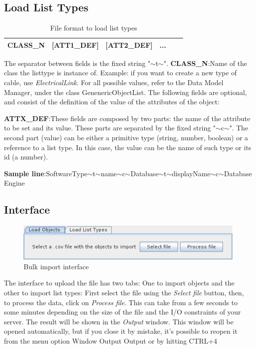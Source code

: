 \documentclass[a4paper]{article}
\begin{document}
			\subsection{Load List Types}\label{sec:bi_load_list_types}	
				\begin{table}[!h]
					\centering
					\begin{tabular}{|l|l|l|l|l|l|}
						\hline
						CLASS\_N& [ATT1\_DEF] & [ATT2\_DEF] & ...  \\ \hline
					\end{tabular}
					\caption{File format to load list types}
					\label{tab:file_format_list_types}
				\end{table}
				The separator between fields is the fixed string "$\sim$t$\sim$".	
				\textbf{CLASS\_N}:Name of the class the listtype is instance of. Example: if you want to create a new type of cable, use \textit{ElectricalLink}. For all possible values, refer to the Data Model Manager, under the class GenenericObjectList.
				\newline
				The following fields are optional, and consist of the definition of the value of the attributes 
				of the object:
				
	  			\textbf{ATTX\_DEF}:These fields are composed by two parts: the name of the attribute to be set and its value. These parts are separated by the fixed string "$\sim$c$\sim$". The second part (value) can be either a primitive type (string, number, boolean) or a reference to a list type. In this case, the value can be the name of such type or its id (a number). 

	  			\textbf{Sample line}:SoftwareType$\sim$t$\sim$name$\sim$c$\sim$Database$\sim$t$\sim$displayName$\sim$c$\sim$Database Engine

			\subsection{Interface}\label{sec:bi_interface}
			
				\begin{figure}[h!]
					\centering
					\includegraphics[width=0.7\linewidth]{img/bulk_import_main_window.png}
					\caption{Bulk import interface}
					\label{fig:bulk_import_interface}
				\end{figure}					
				The interface to upload the file has two tabs: One to import objects and the other to import list types:
				First select the file using the  \textit{Select file} button, then, to process the data, click on \textit{Process file}. This can take from a few seconds to some minutes depending on the size of the file and the I/O constraints of your server. The result will be shown in the \textit{Output} window. This window will be opened automatically, but if you close it by mistake, it’s possible to reopen it from the menu option Window Output Output or by hitting CTRL+4
\end{document}
